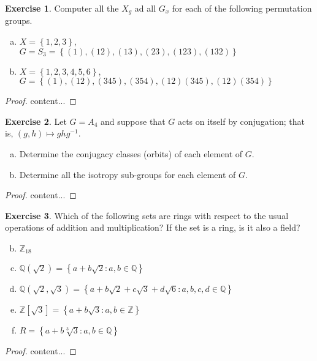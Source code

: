 \documentclass{article}
\theoremstyle{definition}
\newtheorem{theorem}{Exercise}[section]
\theoremstyle{plain}
\newcommand{\Z}{\mathbb{Z}}
\newcommand{\Q}{\mathbb{Q}}
\newcommand{\inv}[1]{#1^{-1}}
\begin{document}
	\setcounter{section}{14}
	\setcounter{theorem}{1}
	\begin{theorem}
		Computer all the $X_g$ ad all $G_x$ for each of the following permutation groups.
		\begin{enumerate}[(a)]
			\item $X = \left\{ 1,2,3 \right\}$,\\
			$G = S_3 = \left\{ (1), (12), (13), (23), (123), (132) \right\}$
			
			\item $X = \left\{ 1,2,3,4,5,6 \right\}$,\\
			$G = \left\{ (1), (12), (345), (354), (12)(345), (12)(354) \right\}$
		\end{enumerate}
	\end{theorem}
	\begin{proof}
		content...
	\end{proof}
	
	
	\setcounter{theorem}{4}
	\begin{theorem}
		Let $G = A_4$ and suppose that $G$ acts on itself by conjugation; that is, $\left( g, h \right) \mapsto gh\inv{g}$. 
		\begin{enumerate}[(a)]
			\item Determine the conjugacy classes (orbits) of each element of $G$.
			\item Determine all the isotropy sub-groups for each element of $G$. 
		\end{enumerate}
	\end{theorem}
	\begin{proof}
		content...
	\end{proof}

	\setcounter{section}{16}
	\setcounter{theorem}{0}
	\begin{theorem}
		Which of the following sets are rings with respect to the usual operations of addition and multiplication? If the set is a ring, is it also a field?
		\begin{enumerate}[(a)]
			\setcounter{enumi}{1}
			\item $\Z_{18}$
			\item $\Q \left( \sqrt{2} \right) = \left\{ a + b\sqrt{2} : a,b \in \Q \right\}$
			\item $\Q \left( \sqrt{2}, \sqrt{3} \right) = \left\{ a + b\sqrt{2} + c\sqrt{3} + d\sqrt{6} : a,b,c,d \in \Q \right\}$
			\item $\Z \left[ \sqrt{3} \right] = \left\{ a + b\sqrt{3} : a,b \in \Z \right\}$
			\item $R = \left\{ a + b\sqrt[3]{3} : a,b \in \Q \right\}$
		\end{enumerate}
	\end{theorem}
	\begin{proof}
		content...
	\end{proof}
\end{document}
